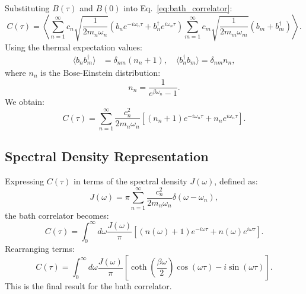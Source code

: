 Substituting \( B(\tau) \) and \( B(0) \) into Eq.~\eqref{eq:bath_correlator}:
\begin{equation} \label{eq:correlator_substitution}
C(\tau) = \left\langle \sum_{n=1}^{\infty} c_n \sqrt{\frac{1}{2 m_n \omega_n}} (b_n e^{-i \omega_n \tau} + b_n^\dagger e^{i \omega_n \tau}) \sum_{m=1}^{\infty} c_m \sqrt{\frac{1}{2 m_m \omega_m}} (b_m + b_m^\dagger) \right\rangle.
\end{equation}
Using the thermal expectation values:
\begin{align} \label{eq:thermal_expectations}
\langle b_n b_m^\dagger \rangle &= \delta_{nm} (n_n + 1), \quad \langle b_n^\dagger b_m \rangle = \delta_{nm} n_n,
\end{align}
where \( n_n \) is the Bose-Einstein distribution:
\begin{equation} \label{eq:bose_einstein_distribution}
n_n = \frac{1}{e^{\beta \omega_n} - 1}.
\end{equation}
We obtain:
\begin{equation} \label{eq:correlator_result}
C(\tau) = \sum_{n=1}^{\infty} \frac{c_n^2}{2 m_n \omega_n} \left[ (n_n + 1) e^{-i \omega_n \tau} + n_n e^{i \omega_n \tau} \right].
\end{equation}

\subsection{Spectral Density Representation}
\label{subsec:spectral_density}

Expressing \( C(\tau) \) in terms of the spectral density \( J(\omega) \), defined as:
\begin{equation} \label{eq:spectral_density}
J(\omega) = \pi \sum_{n=1}^{\infty} \frac{c_n^2}{2 m_n \omega_n} \delta(\omega - \omega_n),
\end{equation}
the bath correlator becomes:
\begin{equation} \label{eq:correlator_spectral_density}
C(\tau) = \int_0^\infty d\omega \frac{J(\omega)}{\pi} \left[ (n(\omega) + 1) e^{-i \omega \tau} + n(\omega) e^{i \omega \tau} \right].
\end{equation}
Rearranging terms:
\begin{equation} \label{eq:correlator_final}
C(\tau) = \int_0^\infty d\omega \frac{J(\omega)}{\pi} \left[ \coth\left( \frac{\beta \omega}{2} \right) \cos(\omega \tau) - i \sin(\omega \tau) \right].
\end{equation}
This is the final result for the bath correlator.
